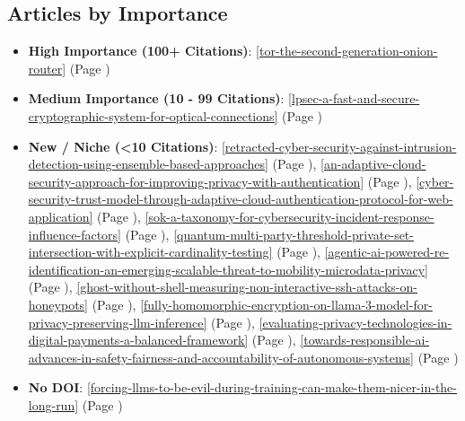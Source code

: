 \documentclass{article}
\begin{document}
\subsection*{Articles by Importance}
\begin{itemize}
  \item \textbf{High Importance (100+ Citations)}: \ref{tor-the-second-generation-onion-router} (Page \pageref{tor-the-second-generation-onion-router})
  \item \textbf{Medium Importance (10 - 99 Citations)}: \ref{lpsec-a-fast-and-secure-cryptographic-system-for-optical-connections} (Page \pageref{lpsec-a-fast-and-secure-cryptographic-system-for-optical-connections})
  \item \textbf{New / Niche (<10 Citations)}: \ref{retracted-cyber-security-against-intrusion-detection-using-ensemble-based-approaches} (Page \pageref{retracted-cyber-security-against-intrusion-detection-using-ensemble-based-approaches}), \ref{an-adaptive-cloud-security-approach-for-improving-privacy-with-authentication} (Page \pageref{an-adaptive-cloud-security-approach-for-improving-privacy-with-authentication}), \ref{cyber-security-trust-model-through-adaptive-cloud-authentication-protocol-for-web-application} (Page \pageref{cyber-security-trust-model-through-adaptive-cloud-authentication-protocol-for-web-application}), \ref{sok-a-taxonomy-for-cybersecurity-incident-response-influence-factors} (Page \pageref{sok-a-taxonomy-for-cybersecurity-incident-response-influence-factors}), \ref{quantum-multi-party-threshold-private-set-intersection-with-explicit-cardinality-testing} (Page \pageref{quantum-multi-party-threshold-private-set-intersection-with-explicit-cardinality-testing}), \ref{agentic-ai-powered-re-identification-an-emerging-scalable-threat-to-mobility-microdata-privacy} (Page \pageref{agentic-ai-powered-re-identification-an-emerging-scalable-threat-to-mobility-microdata-privacy}), \ref{ghost-without-shell-measuring-non-interactive-ssh-attacks-on-honeypots} (Page \pageref{ghost-without-shell-measuring-non-interactive-ssh-attacks-on-honeypots}), \ref{fully-homomorphic-encryption-on-llama-3-model-for-privacy-preserving-llm-inference} (Page \pageref{fully-homomorphic-encryption-on-llama-3-model-for-privacy-preserving-llm-inference}), \ref{evaluating-privacy-technologies-in-digital-payments-a-balanced-framework} (Page \pageref{evaluating-privacy-technologies-in-digital-payments-a-balanced-framework}), \ref{towards-responsible-ai-advances-in-safety-fairness-and-accountability-of-autonomous-systems} (Page \pageref{towards-responsible-ai-advances-in-safety-fairness-and-accountability-of-autonomous-systems})
  \item \textbf{No DOI}: \ref{forcing-llms-to-be-evil-during-training-can-make-them-nicer-in-the-long-run} (Page \pageref{forcing-llms-to-be-evil-during-training-can-make-them-nicer-in-the-long-run})
\end{itemize}
\end{document}
